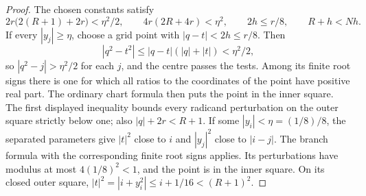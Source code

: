 \begin{proof}
The chosen constants satisfy
\[
 2r\bigl(2(R+1)+2r\bigr)<\eta^2/2,\qquad
 4r(2R+4r)<\eta^2,\qquad 2h\le r/8,\qquad R+h<Nh.
\]
If every $|y_j|\ge\eta$, choose a grid point with $|q-t|<2h\le r/8$. Then
\[
 |q^2-t^2|\le |q-t|(|q|+|t|)<\eta^2/2,
\]
so $|q^2-j|>\eta^2/2$ for each $j$, and the centre passes the tests.
Among its finite root signs there is one for which all ratios to the coordinates of the point have positive real part.
The ordinary chart formula then puts the point in the inner square. The first displayed inequality bounds every
radicand perturbation on the outer square strictly below one; also $|q|+2r<R+1$.
If some $|y_i|<\eta=(1/8)/8$, the separated parameters give $|t|^2$ close to $i$ and $|y_j|^2$ close to $|i-j|$.
The branch formula with the corresponding finite root signs applies. Its perturbations have modulus at most
$4(1/8)^2<1$, and the point is in the inner square. On its closed outer square,
$|t|^2=|i+y_i^2|\le i+1/16<(R+1)^2$.
\end{proof}

